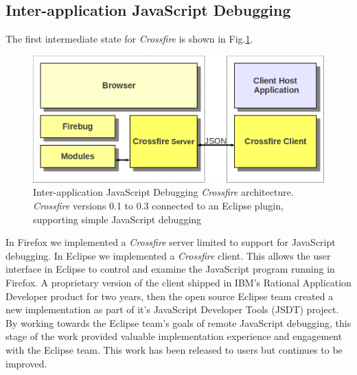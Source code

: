 \subsection{Inter-application JavaScript Debugging}
The first intermediate state for \textit{Crossfire} is shown in Fig.\ref{fig:fireclipse}.
\begin{figure}[htp]
  \includegraphics[width = 86 mm]{figures/fireclipse}
  \caption{Inter-application JavaScript Debugging \textit{Crossfire} architecture.
\textit{Crossfire} versions 0.1 to 0.3 connected to an Eclipse plugin, supporting simple JavaScript debugging}
 \label{fig:fireclipse}
\end{figure}
In Firefox we implemented a \textit{Crossfire} server limited to support for JavaScript debugging.
In Eclipse we implemented a \textit{Crossfire} client. This allows the user interface in Eclipse to control
 and examine the JavaScript program running
in Firefox.  A proprietary version of the client shipped in IBM's Rational
Application Developer product for two years, then the open source Eclipse team created a new implementation as part of it's JavaScript Developer
Tools (JSDT) project\cite{EclipseJSDT}.  By working towards the Eclipse team's
goals of remote JavaScript debugging, this stage of the work provided valuable implementation
experience and engagement with the Eclipse team.
This work has been released to users but continues to be improved.

